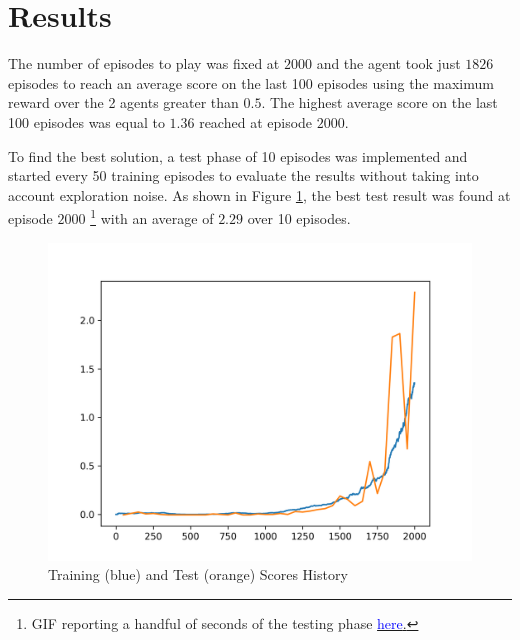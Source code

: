 \documentclass[letterpaper]{article}
\begin{document}
\section{Results}

The number of episodes to play was fixed at $2000$ and the agent took just $1826$ episodes to reach an average score on the last 100 episodes using the maximum reward over the 2 agents greater than $0.5$. The highest average score on the last 100 episodes was equal to $1.36$ reached at episode $2000$.

To find the best solution, a test phase of 10 episodes was implemented and started every 50 training episodes to evaluate the results without taking into account exploration noise. As shown in Figure \ref{fig:plot}, the best test result was found at episode $2000$ \footnote{GIF reporting a handful of seconds of the testing phase \href{https://raw.githubusercontent.com/pieromacaluso/collaboration-n-competition/14820105ae05007df12a2a844f34532779916151/stuff/solved_gif.gif}{\textcolor{blue}{here}.}} with an average of $2.29$ over 10 episodes.

\begin{figure}[h!]\includegraphics[width=\linewidth]{img/avg.png}
\caption{Training (blue) and Test (orange) Scores History\label{fig:plot}}
\end{figure}   
\end{document}
